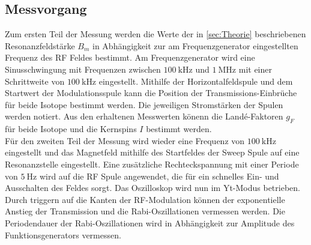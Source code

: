 \subsection{Messvorgang}
Zum ersten Teil der Messung werden die Werte der in \autoref{sec:Theorie} beschriebenen Resonanzfeldstärke $B_m$ in Abhängigkeit zur am Frequenzgenerator 
eingestellten Frequenz des RF Feldes bestimmt. Am Frequenzgenerator wird eine Sinusschwingung mit Frequenzen zwischen $\qty{100}{\kilo\hertz}$ und 
$\qty{1}{\mega\hertz}$ mit einer Schrittweite von $\qty{100}{\kilo\hertz}$ eingestellt. Mithilfe der Horizontalfeldspule und dem Startwert der Modulationsspule 
kann die Position der Transmissions-Einbrüche für beide Isotope bestimmt werden. Die jeweiligen Stromstärken der Spulen werden notiert.
Aus den erhaltenen Messwerten könenn die Landé-Faktoren $g_F$ für beide Isotope und die Kernspins $I$ bestimmt werden. \\

Für den zweiten Teil der Messung wird wieder eine Frequenz von $\qty{100}{\kilo\hertz}$ eingestellt und das Magnetfeld mithilfe des Startfeldes der Sweep Spule
auf eine Resonanzstelle eingestellt. Eine zusätzliche Rechteckspannung mit einer Periode von $\qty{5}{\hertz}$ wird auf die RF Spule angewendet, die für ein schnelles 
Ein- und Ausschalten des Feldes sorgt. Das Oszilloskop wird nun im Yt-Modus betrieben. Durch triggern auf die Kanten der RF-Modulation können der 
exponentielle Anstieg der Transmission und die Rabi-Oszillationen vermessen werden. Die Periodendauer der Rabi-Oszillationen wird in Abhängigkeit zur Amplitude des 
Funktionsgenerators vermessen.

